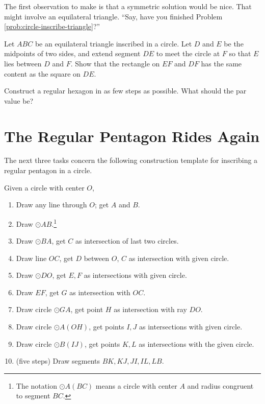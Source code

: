 \begin{annotation}
{
\color{blue}
The first observation to make is that a symmetric solution would be nice. That might involve an equilateral triangle. ``Say, have you finished Problem \ref{prob:circle-inscribe-triangle}?''
}
\end{annotation}

\begin{problem}\label{prob:inscribed-circle-content}
Let $ABC$ be an equilateral triangle inscribed in a circle. Let $D$ and $E$ be the midpoints of two sides, and extend segment $DE$ to meet the circle at $F$ so that $E$ lies between $D$ and $F$. Show that the rectangle on $EF$ and $DF$ has the same content as the square on $DE$.
\end{problem}


\begin{challenge}\label{chal:hexagon}
Construct a regular hexagon in as few steps as possible. What should the par value be?
\end{challenge}


\chapter{The Regular Pentagon Rides Again}


The next three tasks concern the following construction template for inscribing a regular pentagon in a circle. 



Given a circle with center $O$,
\begin{enumerate}
\item Draw any line through $O$; get $A$ and $B$.
\item Draw $\odot AB$.\footnote{The notation $\odot A(BC)$ means a circle with center $A$ and radius congruent to segment $BC$.}
\item Draw $\odot BA$, get $C$ as intersection of last two circles.
\item Draw line $OC$, get $D$ between $O$, $C$ as intersection with given circle.
\item Draw $\odot DO$, get $E, F$ as intersections with given circle.
\item Draw $EF$, get $G$ as intersection with $OC$.
\item Draw circle $\odot GA$, get point $H$ as intersection with ray $DO$.
\item Draw circle $\odot A(OH)$, get points $I, J$ as intersections with given circle.
\item Draw circle $\odot B(IJ)$, get points $K, L$ as intersections with the given circle.
\item (five steps) Draw segments $BK, KJ, JI, IL, LB$.
\end{enumerate}


